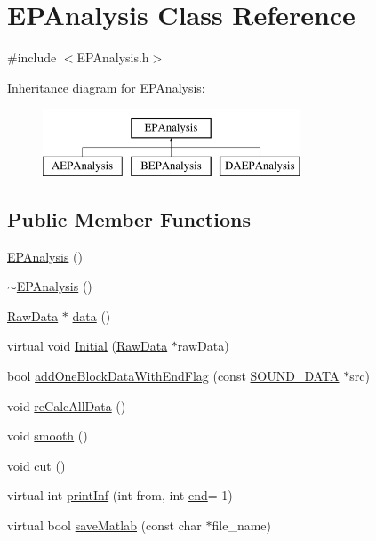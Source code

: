 \hypertarget{class_e_p_analysis}{\section{E\+P\+Analysis Class Reference}
\label{class_e_p_analysis}
}


{\ttfamily \#include $<$E\+P\+Analysis.\+h$>$}

Inheritance diagram for E\+P\+Analysis\+:\begin{figure}[H]
\begin{center}
\leavevmode
\includegraphics[height=2.000000cm]{class_e_p_analysis}
\end{center}
\end{figure}
\subsection*{Public Member Functions}
\begin{DoxyCompactItemize}
\item 
\hyperlink{class_e_p_analysis_a0b65e06f79424966ef106c1f39cdc2dc}{E\+P\+Analysis} ()
\item 
\hyperlink{class_e_p_analysis_a0bf9e48c6441fed0f5d7c8e755f097f3}{$\sim$\+E\+P\+Analysis} ()
\item 
\hyperlink{class_raw_data}{Raw\+Data} $\ast$ \hyperlink{class_e_p_analysis_a09d2b16c0ff0e77fc66c74e54ee1c279}{data} ()
\item 
virtual void \hyperlink{class_e_p_analysis_a7e7311c513772986b89d97c7bde0eb39}{Initial} (\hyperlink{class_raw_data}{Raw\+Data} $\ast$raw\+Data)
\item 
bool \hyperlink{class_e_p_analysis_a5689e3c5824f3640bc76affd01d5724e}{add\+One\+Block\+Data\+With\+End\+Flag} (const \hyperlink{configure__basic_8h_abf32ffaff24ba21700fbd0898b49ab02}{S\+O\+U\+N\+D\+\_\+\+D\+A\+T\+A} $\ast$src)
\item 
void \hyperlink{class_e_p_analysis_a957fbafe0e4a9f7080ea4c37bcbd212c}{re\+Calc\+All\+Data} ()
\item 
void \hyperlink{class_e_p_analysis_a295580a18959d01e9f87a7514c5a0e74}{smooth} ()
\item 
void \hyperlink{class_e_p_analysis_a4b999949ec5b73194b29a533da8f00c8}{cut} ()
\item 
virtual int \hyperlink{class_e_p_analysis_a04fb7764261d7d579aa5bc98331b8a16}{print\+Inf} (int from, int \hyperlink{lpc2spec_8m_a75a3ccc1a712583b6c4b21b94514a7b9}{end}=-\/1)
\item 
virtual bool \hyperlink{class_e_p_analysis_a082819267ab6a37c293a07cf5e3e792b}{save\+Matlab} (const char $\ast$file\+\_\+name)
\end{DoxyCompactItemize}
